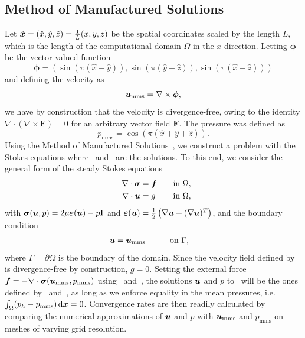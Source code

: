 \documentclass{WileyMSP-template}
\begin{document}
\subsection{Method of Manufactured Solutions}\label{subsec:mms}
Let $\hat{\bm{x}} = (\hat{x}, \hat{y}, \hat{z}) = \frac{1}{L}(x, y, z)$
be the spatial coordinates scaled by the length $L$, which is the length of
the computational domain $\Omega$ in the $x$-direction. Letting $\bm{\phi}$ be
the vector-valued function
\begin{equation*}
    \bm{\phi} = \left(\sin{(\pi(\hat{x} - \hat{y}))},
    \sin{(\pi(\hat{y} + \hat{z}))},
    \sin{(\pi(\hat{x} - \hat{z}))}\right)
\end{equation*}
and defining the velocity as 
\begin{equation}
    \bm{u}_{\mathrm{mms}} = \nabla\times\bm{\phi},
    \label{eq:velocity_mms}
\end{equation}
we have by construction that the velocity is divergence-free,
owing to the identity $\nabla\cdot(\nabla\times\bm{F}) = 0$ for
an arbitrary vector field $\bm{F}$. The pressure was defined as
\begin{equation}
    p_{\mathrm{mms}} = \cos{(\pi(\hat{x} + \hat{y} + \hat{z}))}.
    \label{eq:pressure_mms}
\end{equation}
Using the Method of Manufactured Solutions~\cite{Roache2001CodeSolutions},
we construct a problem with the Stokes equations where~
and~ are the solutions.
To this end, we consider the general form of the steady Stokes equations
\begin{subequations}
    \begin{align}
        -\nabla\cdot\bm{\sigma} &= \bm{f} \qquad\mathrm{in \ }\Omega,\\
        \nabla\cdot\bm{u} &= g \qquad\mathrm{\, in \ }\Omega,
    \end{align}
    \label{eq:stokes_mms}%
\end{subequations}%
with $\bm{\sigma}(\bm{u}, p) = 2\mu\bm{\varepsilon}(\bm{u}) - p\mathbf{I}$ and
$\bm{\varepsilon}(\bm{u}) = \frac{1}{2}\left(\nabla\bm{u} + (\nabla\bm{u})^T\right)$, and the boundary condition
\begin{alignat}{2}
    \bm{u} &= \bm{u}_{\mathrm{mms}} \qquad&&\mathrm{on \ }\Gamma,
\end{alignat}
where $\Gamma=\partial\Omega$ is the boundary of the domain.
Since the velocity field defined by~ is divergence-free by construction,
$g = 0$. Setting the external force $\bm{f}=-\nabla\cdot\bm{\sigma}(\bm{u}_{\mathrm{mms}}, p_{\mathrm{mms}})$
using~ and~,
the solutions $\bm{u}$ and $p$ to~ will be the ones
defined by~ and~,
as long as we enforce equality in the mean pressures, i.e. $\int_{\Omega}(p_h - p_{\mathrm{mms}}) \, \mathrm d\bm{x}=0$.
Convergence rates are then readily calculated by comparing the numerical approximations of
$\bm{u}$ and $p$ with $\bm{u}_{\mathrm{mms}}$ and $p_{\mathrm{mms}}$
on meshes of varying grid resolution.
\end{document}
